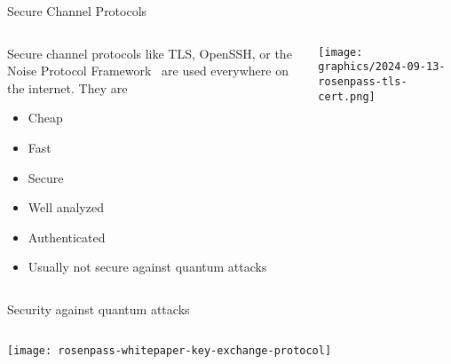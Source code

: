 
\begin{frame}{Secure Channel Protocols}
  \begin{columns}[T,onlytextwidth]
    \begin{column}{.4\linewidth}
      \small

      Secure channel protocols like TLS, OpenSSH, or the Noise Protocol Framework \citeNoise~are used everywhere on the internet. They are

      \begin{itemize}
        \item Cheap
        \item Fast
        \item Secure
        \item Well analyzed
        \item Authenticated
        \item Usually not secure against quantum attacks
      \end{itemize}
    \end{column}
    \begin{column}{.55\linewidth}
    \raggedleft
    \texttt{[image: graphics/2024-09-13-rosenpass-tls-cert.png]}
    \end{column}
  \end{columns}
\end{frame}

\begin{frame}{Security against quantum attacks}
  \begin{columns}[fullwidth,c]
    \begin{column}{.6\linewidth}
      \texttt{[image: rosenpass-whitepaper-key-exchange-protocol]}
    \end{column}

    \begin{column}{.4\linewidth}
    \end{column}
  \end{columns}
\end{frame}

